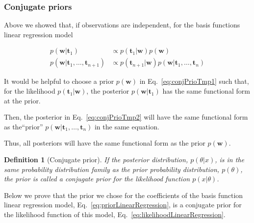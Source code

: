 \documentclass[11pt]{beamer}
\newtheorem{probDef}{Definition}
\begin{document}
\begin{frame}
    \frametitle{Conjugate priors}

    \scriptsize
    Above we showed that, if observations are independent, for the basis
    functions linear regression model

    \begin{align}
        p(\mathbf{w}|\mathbf{t}_1)&\propto
        p(\mathbf{t}_1|\mathbf{w})p(\mathbf{w})\label{eq:conjPrioTmp1}\\
        p(\mathbf{w}|\mathbf{t}_1,\ldots,\mathbf{t}_{n+1})&\propto p(\mathbf{t}_{n+1}|\mathbf{w})p(\mathbf{w}|\mathbf{t}_1,\ldots,\mathbf{t}_n)\label{eq:conjPrioTmp2}
    \end{align}

    It would be helpful to choose a prior $p(\mathbf{w})$ in Eq.~\ref{eq:conjPrioTmp1} such that, for the
    likelihood $p(\mathbf{t}_1|\mathbf{w})$, the posterior
    $p(\mathbf{w}|\mathbf{t}_1)$ has the same functional form at the prior.

    Then, the posterior in Eq.~\ref{eq:conjPrioTmp2} will have the same
    functional form as the``prior''
    $p(\mathbf{w}|\mathbf{t}_1,\ldots,\mathbf{t}_n)$ in the same equation.

    Thus, all posteriors will have the same functional form as the prior
    $p(\mathbf{w})$.

    \begin{probDef}[Conjugate prior]
        If the posterior distribution, $p(\theta|x)$, is in the same
        probability distribution family as the prior probability distribution,
        $p(\theta)$, the prior is called a conjugate prior for the likelihood
        function $p(x|\theta)$.
    \end{probDef}

    Below we prove that the prior we chose for the coefficients of the basis
    function linear regression model, Eq.~\ref{eq:priorLinearRegression}, is a
    conjugate prior for the likelihood function of this model,
    Eq.~\ref{eq:likelihoodLinearRegression}.

    \normalsize

\end{frame}
\end{document}

